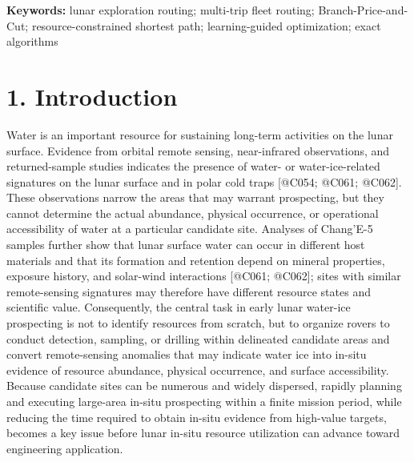 \documentclass[
  11pt,
]{article}
\begin{document}
\textbf{Keywords:} lunar exploration routing; multi-trip fleet routing;
Branch-Price-and-Cut; resource-constrained shortest path;
learning-guided optimization; exact algorithms

\hypertarget{introduction}{%
\section{1. Introduction}\label{introduction}}

Water is an important resource for sustaining long-term activities on
the lunar surface. Evidence from orbital remote sensing, near-infrared
observations, and returned-sample studies indicates the presence of
water- or water-ice-related signatures on the lunar surface and in polar
cold traps {[}@C054; @C061; @C062{]}. These observations narrow the
areas that may warrant prospecting, but they cannot determine the actual
abundance, physical occurrence, or operational accessibility of water at
a particular candidate site. Analyses of Chang'E-5 samples further show
that lunar surface water can occur in different host materials and that
its formation and retention depend on mineral properties, exposure
history, and solar-wind interactions {[}@C061; @C062{]}; sites with
similar remote-sensing signatures may therefore have different resource
states and scientific value. Consequently, the central task in early
lunar water-ice prospecting is not to identify resources from scratch,
but to organize rovers to conduct detection, sampling, or drilling
within delineated candidate areas and convert remote-sensing anomalies
that may indicate water ice into in-situ evidence of resource abundance,
physical occurrence, and surface accessibility. Because candidate sites
can be numerous and widely dispersed, rapidly planning and executing
large-area in-situ prospecting within a finite mission period, while
reducing the time required to obtain in-situ evidence from high-value
targets, becomes a key issue before lunar in-situ resource utilization
can advance toward engineering application.
\end{document}
